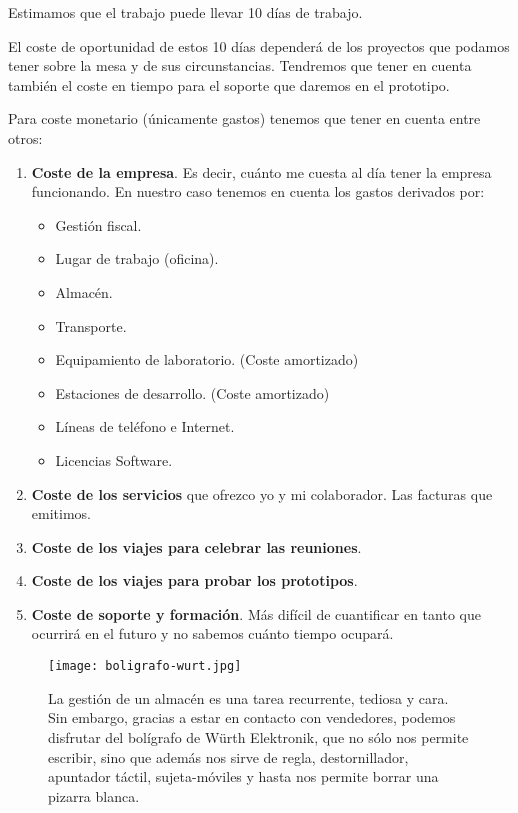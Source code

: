 Estimamos que el trabajo puede llevar 10 días de trabajo.

El coste de oportunidad de estos 10 días dependerá de los
proyectos que podamos tener sobre la mesa y de sus circunstancias.
Tendremos que tener en cuenta también el coste en tiempo
para el soporte que daremos en el prototipo.

Para coste monetario (únicamente gastos) tenemos que tener en cuenta
entre otros:

\begin{enumerate}
    \item \textbf{Coste de la empresa}. Es decir, cuánto me
          cuesta al día tener la empresa funcionando.
          En nuestro caso tenemos en cuenta los gastos
          derivados por:
        \begin{itemize}[noitemsep,nolistsep]
            \item Gestión fiscal.
            \item Lugar de trabajo (oficina).
            \item Almacén.
            \item Transporte.
            \item Equipamiento de laboratorio. (Coste amortizado)
            \item Estaciones de desarrollo. (Coste amortizado)
            \item Líneas de teléfono e Internet.
            \item Licencias Software.
        \end{itemize}
    \item \textbf{Coste de los servicios} que ofrezco yo y mi
          colaborador. Las facturas que emitimos.
    \item \textbf{Coste de los viajes para celebrar las reuniones}.
    \item \textbf{Coste de los viajes para probar los prototipos}.
    \item \textbf{Coste de soporte y formación}. Más difícil de cuantificar
          en tanto que ocurrirá en el futuro y no sabemos
          cuánto tiempo ocupará.
\end{enumerate}

\begin{figure}[h]
    \centering
    \texttt{[image: boligrafo-wurt.jpg]}
    \caption{La gestión de un almacén es una tarea recurrente, tediosa y cara. Sin embargo,
    gracias a estar en contacto con vendedores, podemos disfrutar del bolígrafo de
    Würth Elektronik, que
    no sólo nos permite escribir, sino que además nos sirve de regla, destornillador,
    apuntador táctil, sujeta-móviles y hasta nos permite borrar una pizarra blanca.}
\end{figure}

